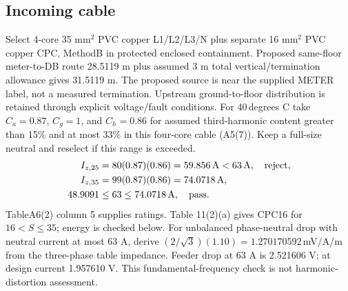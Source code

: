 \documentclass[11pt,a4paper]{article}
\begin{document}
\subsection*{Incoming cable}
Select 4-core 35 mm$^2$ PVC copper L1/L2/L3/N plus separate 16 mm$^2$ PVC copper CPC, MethodB in protected enclosed containment. Proposed same-floor meter-to-DB route 28.5119 m plus assumed 3 m total vertical/termination allowance gives 31.5119 m. The proposed source is near the supplied METER label, not a measured termination. Upstream ground-to-floor distribution is retained through explicit voltage/fault conditions.
For 40\,degrees C take $C_a=0.87$, $C_g=1$, and $C_h=0.86$ for assumed third-harmonic content greater than 15\% and at most 33\% in this four-core cable (A5(7)). Keep a full-size neutral and reselect if this range is exceeded.
\begin{align*}
I_{z,25}&=80(0.87)(0.86)=59.856\,{\rm A}<63\,{\rm A},\quad\text{reject},\\
I_{z,35}&=99(0.87)(0.86)=74.0718\,{\rm A},\\
48.9091&\le63\le74.0718\,{\rm A},\quad\text{pass}.
\end{align*}
TableA6(2) column 5 supplies ratings. Table 11(2)(a) gives CPC16 for $16<S\le 35$;  energy is checked below. For unbalanced phase-neutral drop with neutral current at most 63 A, derive $(2/\sqrt 3)(1.10)=1.270170592$\,mV/A/m from the three-phase table impedance. Feeder drop at 63 A is 2.521606 V;  at design current 1.957610 V. This fundamental-frequency check is not harmonic-distortion assessment.
\end{document}
